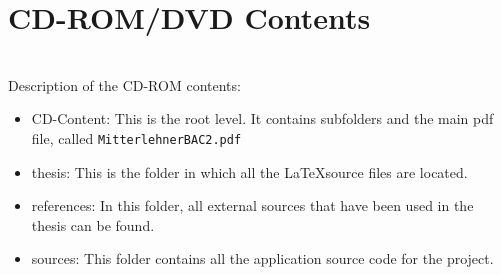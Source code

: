 \chapter{CD-ROM/DVD Contents}
\label{app:cdrom}

\text{}\\
Description of the CD-ROM contents:
\begin{itemize}
	\item CD-Content: This is the root level. It contains subfolders and the main pdf file, called \texttt{Mitterlehner\textunderscore BAC2.pdf}
	\item thesis: This is the folder in which all the \LaTeX source files are located.
	\item references: In this folder, all external sources that have been used in the thesis can be found.
	\item sources: This folder contains all the application source code for the project.
\end{itemize}

